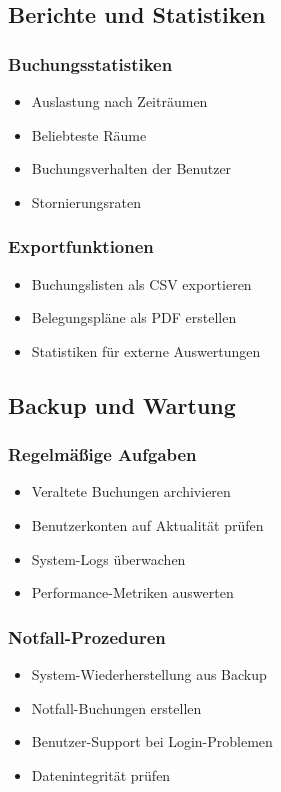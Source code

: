 \subsection{Berichte und Statistiken}

\subsubsection{Buchungsstatistiken}

\begin{itemize}
    \item Auslastung nach Zeiträumen
    \item Beliebteste Räume
    \item Buchungsverhalten der Benutzer
    \item Stornierungsraten
\end{itemize}

\subsubsection{Exportfunktionen}

\begin{itemize}
    \item Buchungslisten als CSV exportieren
    \item Belegungspläne als PDF erstellen
    \item Statistiken für externe Auswertungen
\end{itemize}

\subsection{Backup und Wartung}

\subsubsection{Regelmäßige Aufgaben}

\begin{itemize}
    \item Veraltete Buchungen archivieren
    \item Benutzerkonten auf Aktualität prüfen
    \item System-Logs überwachen
    \item Performance-Metriken auswerten
\end{itemize}

\subsubsection{Notfall-Prozeduren}

\begin{itemize}
    \item System-Wiederherstellung aus Backup
    \item Notfall-Buchungen erstellen
    \item Benutzer-Support bei Login-Problemen
    \item Datenintegrität prüfen
\end{itemize}

\newpage